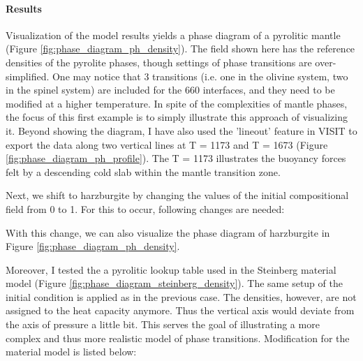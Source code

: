 \paragraph{Results}

\par Visualization of the model results yields a phase diagram of a pyrolitic mantle (Figure \ref{fig:phase_diagram_ph_density}). %
The field shown here has the reference densities of the pyrolite phases, though settings of phase transitions are over-simplified.
One may notice that 3 transitions (i.e. one in the olivine system, two in the spinel system) are included for the 660 interfaces, %
and they need to be modified at a higher temperature.
In spite of the complexities of mantle phases, the focus of this first example is to simply illustrate this approach of visualizing it.
Beyond showing the diagram, I have also used the 'lineout' feature in VISIT to export the data along two vertical lines at T = 1173 and T = 1673 (Figure \ref{fig:phase_diagram_ph_profile}). %
The T = 1173 illustrates the buoyancy forces felt by a descending cold slab within the mantle transition zone.

\par Next, we shift to harzburgite by changing the values of the initial compositional field from 0 to 1.  %
For this to occur, following changes are needed:

With this change, we can also visualize the phase diagram of harzburgite in Figure \ref{fig:phase_diagram_ph_density}.

\par Moreover, I tested the a pyrolitic lookup table used in the Steinberg material model (Figure \ref{fig:phase_diagram_steinberg_density}).%
The same setup of the initial condition is applied as in the previous case. %
The densities, however, are not assigned to the heat capacity anymore.
Thus the vertical axis would deviate from the axis of pressure a little bit.
This serves the goal of illustrating a more complex and thus more realistic model of phase transitions.
Modification for the material model is listed below:


